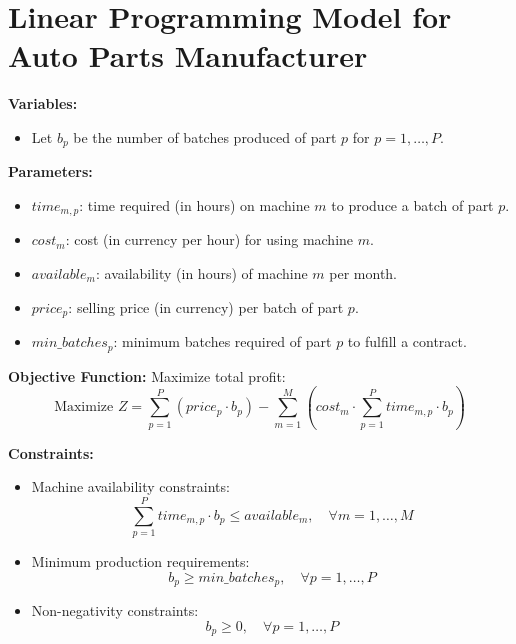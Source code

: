 \documentclass{article}
\begin{document}
\section*{Linear Programming Model for Auto Parts Manufacturer}

\textbf{Variables:}
\begin{itemize}
    \item Let \( b_p \) be the number of batches produced of part \( p \) for \( p = 1, \ldots, P \).
\end{itemize}

\textbf{Parameters:}
\begin{itemize}
    \item \( time_{m,p} \): time required (in hours) on machine \( m \) to produce a batch of part \( p \).
    \item \( cost_{m} \): cost (in currency per hour) for using machine \( m \).
    \item \( available_{m} \): availability (in hours) of machine \( m \) per month.
    \item \( price_{p} \): selling price (in currency) per batch of part \( p \).
    \item \( min\_batches_{p} \): minimum batches required of part \( p \) to fulfill a contract.
\end{itemize}

\textbf{Objective Function:}
Maximize total profit:
\[
\text{Maximize } Z = \sum_{p=1}^{P} \left( price_{p} \cdot b_p \right) - \sum_{m=1}^{M} \left( cost_{m} \cdot \sum_{p=1}^{P} time_{m,p} \cdot b_p \right)
\]

\textbf{Constraints:}
\begin{itemize}
    \item Machine availability constraints:
    \[
    \sum_{p=1}^{P} time_{m,p} \cdot b_p \leq available_{m}, \quad \forall m = 1, \ldots, M
    \]
    
    \item Minimum production requirements:
    \[
    b_p \geq min\_batches_{p}, \quad \forall p = 1, \ldots, P
    \]
    
    \item Non-negativity constraints:
    \[
    b_p \geq 0, \quad \forall p = 1, \ldots, P
    \]
\end{itemize}
\end{document}
